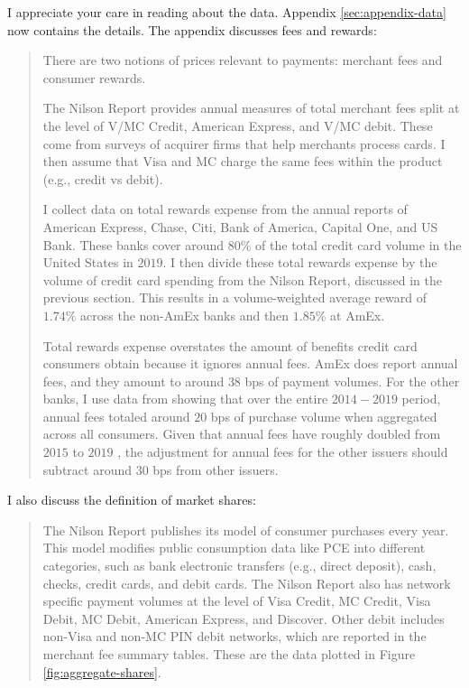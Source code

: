 \documentclass[main.tex]{subfiles}
\begin{document}
\begin{refsection}
I appreciate your care in reading about the data.
Appendix \ref{sec:appendix-data} now contains the details.
The appendix discusses fees and rewards:
\begin{quotation}
    There are two notions of prices relevant to payments: merchant fees and consumer rewards.

    The Nilson Report provides annual measures of total merchant fees split at the level of V/MC Credit, American Express, and V/MC debit.
These come from surveys of acquirer firms that help merchants process cards.
I then assume that Visa and MC charge the same fees within the product (e.g., credit vs debit).

    I collect data on total rewards expense from the annual reports of American Express, Chase, Citi, Bank of America, Capital One, and US Bank.
These banks cover around 80\% of the total credit card volume in the United States in $2019$.
I then divide these total rewards expense by the volume of credit card spending from the Nilson Report, discussed in the previous section.
This results in a volume-weighted average reward of $1.74\%$ across the non-AmEx banks and then $1.85\%$ at AmEx.

    Total rewards expense overstates the amount of benefits credit card consumers obtain because it ignores annual fees.
AmEx does report annual fees, and they amount to around $38$ bps of payment volumes.
For the other banks, I use data from \textcite{Adams.Bord2020} showing that over the entire $2014-2019$ period, annual fees totaled around $20$ bps of purchase volume when aggregated across all consumers.
Given that annual fees have roughly doubled from $2015$ to $2019$ \parencite{CFPB2021}, the adjustment for annual fees for the other issuers should subtract around $30$ bps from other issuers.
\end{quotation} 

I also discuss the definition of market shares:
\begin{quotation}
    The Nilson Report publishes its model of consumer purchases every year.
This model modifies public consumption data like PCE into different categories, such as bank electronic transfers (e.g., direct deposit), cash, checks, credit cards, and debit cards.
The Nilson Report also has network specific payment volumes at the level of Visa Credit, MC Credit, Visa Debit, MC Debit, American Express, and Discover.
Other debit includes non-Visa and non-MC PIN debit networks, which are reported in the merchant fee summary tables.
These are the data plotted in Figure \ref{fig:aggregate-shares}.


\end{quotation}
\end{refsection}
\end{document}
